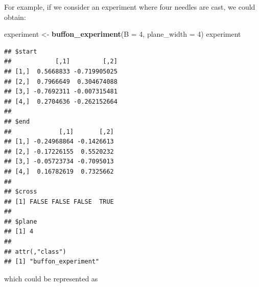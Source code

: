 \documentclass[12pt,]{krantz}
\newenvironment{Shaded}{\begin{snugshade}}{\end{snugshade}}
\newcommand{\KeywordTok}[1]{\textcolor[rgb]{0.27,0.27,0.27}{\textbf{#1}}}
\newcommand{\DataTypeTok}[1]{\textcolor[rgb]{0.27,0.27,0.27}{#1}}
\newcommand{\DecValTok}[1]{\textcolor[rgb]{0.06,0.06,0.06}{#1}}
\newcommand{\StringTok}[1]{\textcolor[rgb]{0.5,0.5,0.5}{#1}}
\newcommand{\OtherTok}[1]{\textcolor[rgb]{0.37,0.37,0.37}{#1}}
\newcommand{\ControlFlowTok}[1]{\textcolor[rgb]{0.27,0.27,0.27}{\textbf{#1}}}
\newcommand{\OperatorTok}[1]{\textcolor[rgb]{0.43,0.43,0.43}{\textbf{#1}}}
\newcommand{\NormalTok}[1]{#1}
\begin{document}
For example, if we consider an experiment where four needles are cast,
we could obtain:

\begin{Shaded}
\begin{Highlighting}[]
\NormalTok{experiment <-}\StringTok{ }\KeywordTok{buffon_experiment}\NormalTok{(}\DataTypeTok{B =} \DecValTok{4}\NormalTok{, }\DataTypeTok{plane_width =} \DecValTok{4}\NormalTok{)}
\NormalTok{experiment}
\end{Highlighting}
\end{Shaded}

\begin{verbatim}
## $start
##            [,1]         [,2]
## [1,]  0.5668833 -0.719905025
## [2,]  0.7966649  0.304674088
## [3,] -0.7692311 -0.007315481
## [4,]  0.2704636 -0.262152664
## 
## $end
##             [,1]       [,2]
## [1,] -0.24968864 -0.1426613
## [2,] -0.17226155  0.5520232
## [3,] -0.05723734 -0.7095013
## [4,]  0.16782619  0.7325662
## 
## $cross
## [1] FALSE FALSE FALSE  TRUE
## 
## $plane
## [1] 4
## 
## attr(,"class")
## [1] "buffon_experiment"
\end{verbatim}

which could be represented as

\begin{Shaded}
\end{Shaded}
\end{document}
